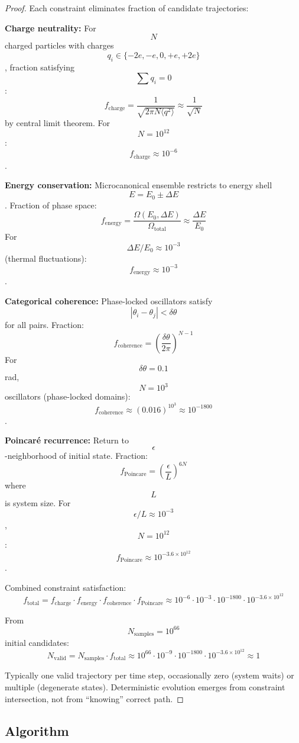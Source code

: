 \documentclass[11pt,twocolumn,a4paper]{article}
\theoremstyle{remark}
\begin{document}
\begin{proof}
Each constraint eliminates fraction of candidate trajectories:

\textbf{Charge neutrality:} For $$N$$ charged particles with charges $$q_i \in \{-2e, -e, 0, +e, +2e\}$$, fraction satisfying $$\sum q_i = 0$$:
$$
f_{\mathrm{charge}} = \frac{1}{\sqrt{2\pi N \langle q^2\rangle}} \approx \frac{1}{\sqrt{N}}
$$
by central limit theorem. For $$N = 10^{12}$$: $$f_{\mathrm{charge}} \approx 10^{-6}$$.

\textbf{Energy conservation:} Microcanonical ensemble restricts to energy shell $$E = E_0 \pm \Delta E$$. Fraction of phase space:
$$
f_{\mathrm{energy}} = \frac{\Omega(E_0, \Delta E)}{\Omega_{\mathrm{total}}} \approx \frac{\Delta E}{E_0}
$$
For $$\Delta E/E_0 \approx 10^{-3}$$ (thermal fluctuations): $$f_{\mathrm{energy}} \approx 10^{-3}$$.

\textbf{Categorical coherence:} Phase-locked oscillators satisfy $$|\theta_i - \theta_j| < \delta\theta$$ for all pairs. Fraction:
$$
f_{\mathrm{coherence}} = \left(\frac{\delta\theta}{2\pi}\right)^{N-1}
$$
For $$\delta\theta = 0.1$$ rad, $$N = 10^3$$ oscillators (phase-locked domains): $$f_{\mathrm{coherence}} \approx (0.016)^{10^3} \approx 10^{-1800}$$.

\textbf{Poincaré recurrence:} Return to $$\epsilon$$-neighborhood of initial state. Fraction:
$$
f_{\mathrm{Poincare}} = \left(\frac{\epsilon}{L}\right)^{6N}
$$
where $$L$$ is system size. For $$\epsilon/L \approx 10^{-3}$$, $$N = 10^{12}$$: $$f_{\mathrm{Poincare}} \approx 10^{-3.6 \times 10^{12}}$$.

Combined constraint satisfaction:
$$
f_{\mathrm{total}} = f_{\mathrm{charge}} \cdot f_{\mathrm{energy}} \cdot f_{\mathrm{coherence}} \cdot f_{\mathrm{Poincare}} \approx 10^{-6} \cdot 10^{-3} \cdot 10^{-1800} \cdot 10^{-3.6 \times 10^{12}}
$$

From $$N_{\mathrm{samples}} = 10^{66}$$ initial candidates:
$$
N_{\mathrm{valid}} = N_{\mathrm{samples}} \cdot f_{\mathrm{total}} \approx 10^{66} \cdot 10^{-9} \cdot 10^{-1800} \cdot 10^{-3.6 \times 10^{12}} \approx 1
$$

Typically one valid trajectory per time step, occasionally zero (system waits) or multiple (degenerate states). Deterministic evolution emerges from constraint intersection, not from ``knowing'' correct path.
\end{proof}

\subsection{Algorithm}
\end{document}
